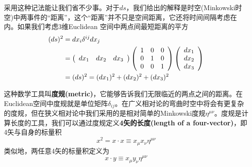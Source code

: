 采用这种记法能让我们省不少事。对于$ds$，我们给出的解释是时空(Minkowski时空)中两事件的“距离”，这个“距离”并不只是空间距离，它还将时间间隔考虑在内。如果我们考虑3维Euclidean 空间中两点间最短距离的平方
\begin{align}
  (ds)^2&=dx_i \delta^{ij} dx_j \notag \\
            &=\left(
               \begin{array}{ccc}
                dx_1 & dx_2 & dx_3 \\
               \end{array}
               \right)
               \left(
               \begin{array}{ccc}
                1 & 0 & 0  \\
                0 & 1 & 0  \\
                0 & 0 & 1  \\
              \end{array}
              \right)
              \left(
              \begin{array}{c}
               dx_1 \\
               dx_2 \\
               dx_3\\
              \end{array}
              \right)\notag \\
           &=(ds)^2=(dx_1)^2+(dx_2)^2+(dx_3)^2\label{equ2.27}
\end{align}

这种数学工具叫{\bf{度规(metric)}}，它能够告诉我们无限临近的两点之间的距离。在Euclidean空间中度规就是单位矩阵$\delta_{ij}$。在广义相对论的弯曲时空中将会有更复杂的度规，但在狭义相对论中我们采用的是相对简单的Minkowski度规$\eta^{\mu\nu}$。度规是计算长度的工具，我们可以通过度规定义{\bf{4矢的长度(length of a four-vector)}}，即4矢与自身的标量积
\[
x^2=x \cdot x \equiv x_\mu x_\nu \eta^{\mu\nu}
\]
类似地，两任意4矢的标量积定义为
\begin{equation}\label{equ2.28}
  x\cdot y\equiv x_\mu y_\nu \eta^{\mu\nu}
\end{equation}

